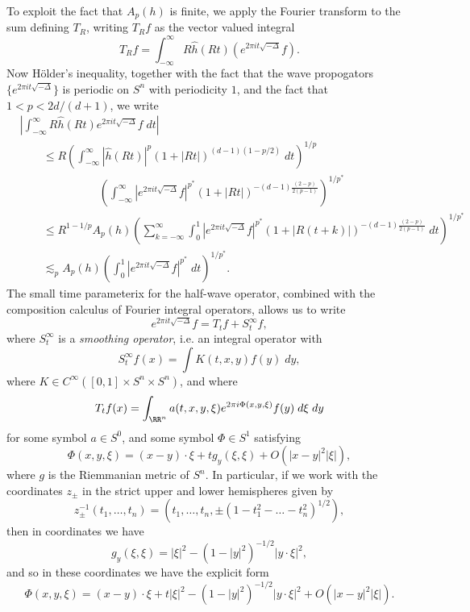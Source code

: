 To exploit the fact that $A_p(h)$ is finite, we apply the Fourier transform to the sum defining $T_R$, writing $T_R f$ as the vector valued integral
%
\[ T_R f = \int_{-\infty}^\infty R \widehat{h}(R t) (e^{2  \pi i t \sqrt{-\Delta}} f). \]
%
Now H\"{o}lder's inequality, together with the fact that the wave propogators $\{ e^{2 \pi i t \sqrt{-\Delta}} \}$ is periodic on $S^n$ with periodicity $1$, and the fact that $1 < p < 2d/(d+1)$, we write
%
\begin{align*}
    & \left| \int_{-\infty}^\infty R \widehat{h}(Rt) e^{2 \pi i t \sqrt{-\Delta}} f\; dt \right|\\
    &\quad\quad\leq R \left( \int_{-\infty}^\infty |\widehat{h}(Rt)|^p (1 + |Rt|)^{(d-1)(1 - p/2)}\; dt \right)^{1/p}\\
    &\quad\quad\quad\quad\quad\quad\quad\left( \int_{-\infty}^\infty |e^{2 \pi i t \sqrt{-\Delta}} f|^{p^*} (1 + |Rt|)^{- (d-1)\frac{(2 - p)}{2(p-1)}} \right)^{1/p^*}\\
    &\quad\quad\leq R^{1 - 1/p} A_p(h) \left( \sum_{k = -\infty}^\infty \int_0^1 |e^{2 \pi i t \sqrt{-\Delta}} f|^{p^*} (1 + |R(t + k)|)^{- (d-1)\frac{(2 - p)}{2(p-1)}}\; dt \right)^{1/p^*}\\
    &\quad\quad\lesssim_p A_p(h) \left( \int_0^1 |e^{2 \pi i t \sqrt{-\Delta}} f|^{p^*}\; dt \right)^{1/p^*}.
\end{align*}
%
The small time parameterix for the half-wave operator, combined with the composition calculus of Fourier integral operators, allows us to write
%
\[ e^{2 \pi i t \sqrt{-\Delta}} f = T_t f + S^\infty_t f, \]
%
where $S^\infty_t$ is a \emph{smoothing operator}, i.e. an integral operator with
%
\[ S^\infty_t f(x) = \int K(t,x,y) f(y)\; dy, \]
%
where $K \in C^\infty([0,1] \times S^n \times S^n)$, and where
%
\[ T_t f(x) = \int_{\RR^n} a(t,x,y,\xi) e^{2 \pi i \Phi(x,y,\xi)} f(y)\; d\xi\; dy \]
%
for some symbol $a \in S^0$, and some symbol $\Phi \in S^1$ satisfying
%
\[ \Phi(x,y,\xi) = (x - y) \cdot \xi + t g_y(\xi,\xi) + O(|x - y|^2 |\xi|), \]
%
where $g$ is the Riemmanian metric of $S^n$. In particular, if we work with the coordinates $z_{\pm}$ in the strict upper and lower hemispheres given by
%
\[ z_{\pm}^{-1}(t_1,\dots,t_n) = (t_1,\dots,t_n, \pm (1-t_1^2 - \dots - t_n^2)^{1/2}), \]
%
then in coordinates we have
%
\[ g_y(\xi,\xi) = |\xi|^2 - (1 - |y|^2)^{-1/2} |y \cdot \xi|^2, \]
%
and so in these coordinates we have the explicit form
%
\[ \Phi(x,y,\xi) = (x - y) \cdot \xi + t |\xi|^2 - (1 - |y|^2)^{-1/2} |y \cdot \xi|^2 + O(|x - y|^2 |\xi|). \]

